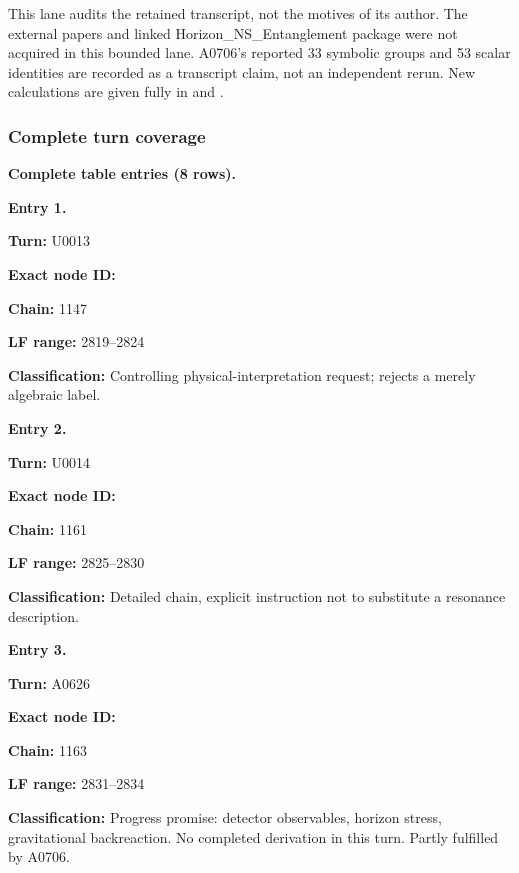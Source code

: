 \documentclass[10pt,a4paper,oneside]{report}
\begin{document}
This lane audits the retained transcript, not the motives of its author.
The external papers and linked Horizon\_NS\_Entanglement package were
not acquired in this bounded lane. A0706's reported 33 symbolic groups
and 53 scalar identities are recorded as a transcript claim, not an
independent rerun. New calculations are given fully in
\protect{} and \protect{}.

\subsubsection{Complete turn coverage}\label{complete-turn-coverage-1}

\textbf{Complete table entries (8 rows).}


\textbf{Entry 1.}

\textbf{Turn:} U0013

\textbf{Exact node ID:}
\protect{}

\textbf{Chain:} 1147

\textbf{LF range:} 2819--2824

\textbf{Classification:} Controlling physical-interpretation request;
rejects a merely algebraic label.


\textbf{Entry 2.}

\textbf{Turn:} U0014

\textbf{Exact node ID:}
\protect{}

\textbf{Chain:} 1161

\textbf{LF range:} 2825--2830

\textbf{Classification:} Detailed
\protect{} chain, explicit
instruction not to substitute a resonance description.


\textbf{Entry 3.}

\textbf{Turn:} A0626

\textbf{Exact node ID:}
\protect{}

\textbf{Chain:} 1163

\textbf{LF range:} 2831--2834

\textbf{Classification:} Progress promise: detector observables, horizon
stress, gravitational backreaction. No completed derivation in this
turn. Partly fulfilled by A0706.
\end{document}
